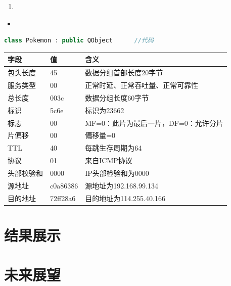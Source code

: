 \documentclass[a4paper, 11pt, oneside]{book} %
\numberwithin{equation}{subsection}
\begin{document}
	\begin{enumerate}
		\item 
	\end{enumerate}

	\begin{itemize}
		\item 
	\end{itemize}

	\begin{lstlisting}[language={C++}]
	class Pokemon : public QObject  	//代码
	\end{lstlisting}
	
	\begin{table}[H]
		\centering
		\begin{tabular}{lll}
			\hline
			字段 & 值 & 含义 \\ \hline
			包头长度 & 45 & 数据分组首部长度20字节 \\ \hline
			服务类型 & 00 & 正常时延、正常吞吐量、正常可靠性 \\ \hline
			总长度 & 003c & 数据分组长度60字节 \\ \hline
			标识 & 5c6e & 标识为23662 \\ \hline
			标志 & 00 & MF=0：此片为最后一片，DF=0：允许分片 \\ \hline
			片偏移 & 00 & 偏移量=0 \\ \hline
			TTL & 40 & 每跳生存周期为64 \\ \hline
			协议 & 01 & 来自ICMP协议 \\ \hline
			头部校验和 & 0000 & IP头部检验和为0000 \\ \hline
			源地址 & c0a86386 & 源地址为192.168.99.134 \\ \hline
			目的地址 & 72ff28a6 & 目的地址为114.255.40.166 \\ \hline
		\end{tabular}
	\end{table}
	
	\section{结果展示}
	
	\section{未来展望}
	
\end{document}
